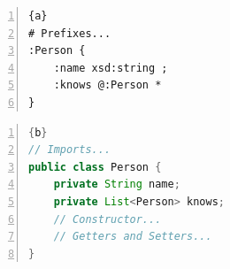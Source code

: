 \begin{center}
	\noindent\begin{minipage}[t]{.4\textwidth}
		\begin{lstlisting}[frame=topline,numbers=left,title=\scriptsize\texttt{Person.shexl}, basicstyle=\ttfamily\scriptsize]{a}
# Prefixes...
:Person {
	:name xsd:string ;
	:knows @:Person *
}
		\end{lstlisting}
	\end{minipage}\hfill
	\begin{minipage}[t]{.5\textwidth}
		\begin{lstlisting}[language=Java, frame=t,numbers=left,title=\scriptsize\texttt{Person.java}, basicstyle=\ttfamily\scriptsize]{b}
// Imports...
public class Person {
	private String name;
	private List<Person> knows;
	// Constructor...
	// Getters and Setters...
}
		\end{lstlisting}
	\end{minipage}
	\label{fig:example-1}
\end{center}